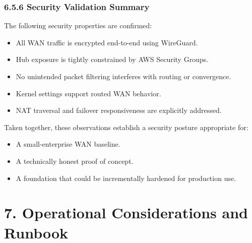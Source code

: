 \documentclass[11pt]{article}
\begin{document}
%
%
\subsubsection{6.5.6 Security Validation Summary}

The following security properties are confirmed:
\begin{itemize}
  \item All WAN traffic is encrypted end-to-end using WireGuard.
  \item Hub exposure is tightly constrained by AWS Security Groups.
  \item No unintended packet filtering interferes with routing or convergence.
  \item Kernel settings support routed WAN behavior.
  \item NAT traversal and failover responsiveness are explicitly addressed.
\end{itemize}

Taken together, these observations establish a security posture appropriate for:
\begin{itemize}
  \item A small-enterprise WAN baseline.
  \item A technically honest proof of concept.
  \item A foundation that could be incrementally hardened for production use.
\end{itemize}

%
%
%
\section{7. Operational Considerations and Runbook}
\label{sec:operations-runbook}
\end{document}
